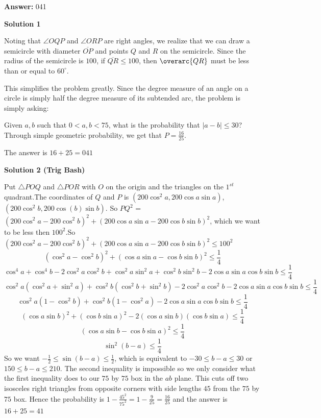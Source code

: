 \begin{enumerate}
 
 \textbf{Answer: }041



\textbf{Solution 1}

Noting that $\angle OQP$ and $\angle ORP$ are right angles, we realize that we can draw a semicircle with diameter $\overline{OP}$ and points $Q$ and $R$ on the semicircle. Since the radius of the semicircle is $100$, if $\overline{QR} \leq 100$, then $\overarc{QR}$ must be less than or equal to $60^{\circ}$.

 This simplifies the problem greatly. Since the degree measure of an angle on a circle is simply half the degree measure of its subtended arc, the problem is simply asking:

 Given $a, b$ such that $0<a, b<75$, what is the probability that $|a-b| \leq 30$? Through simple geometric probability, we get that $P = \frac{16}{25}$.

 The answer is $16+25=\boxed{041}$




\textbf{Solution 2 (Trig Bash)}

Put $\triangle POQ$ and $\triangle POR$ with $O$ on the origin and the triangles on the $1^{st}$ quadrant.The coordinates of $Q$ and $P$ is $(200 \cos^{2}a,200 \cos a\sin a )$, $(200\cos^{2}b,200\cos(b)\sin b)$. So $PQ^{2}$ = $(200 \cos^{2} a - 200 \cos^{2} b)^{2} +(200 \cos a \sin a - 200 \cos b \sin b)^{2}$, which we want to be less then $100^{2}$.So $(200 \cos^{2} a - 200 \cos^{2} b)^{2} +(200 \cos a \sin a - 200 \cos b \sin b)^{2} \le 100^{2}$
 \[(\cos^{2} a - \cos^{2} b)^{2} +(\cos a \sin a - \cos b \sin b)^{2} \le \frac{1}{4}\]
 \[\cos^{4} a + \cos^{4} b - 2\cos^{2} a \cos^{2} b +\cos^{2}a \sin^{2} a + \cos^{2} b \sin^{2} b - 2 \cos a \sin a \cos b \sin b \le \frac{1}{4}\]
 \[\cos^{2} a(\cos^{2} a + \sin^{2} a)+\cos^{2} b(\cos^{2} b+\sin^{2} b) - 2\cos^{2} a \cos^{2} b- 2 \cos a \sin a \cos b \sin b \le \frac{1}{4}\]
 \[\cos^{2} a(1-\cos^{2} b)+\cos^{2} b(1-\cos^{2} a) - 2 \cos a \sin a \cos b \sin b \le \frac{1}{4}\]
 \[(\cos a\sin b)^{2} +(\cos b\sin a)^{2} - 2 (\cos a \sin b)(\cos b \sin a)\le \frac{1}{4}\]
 \[(\cos a\sin b-\cos b\sin a)^{2}\le \frac{1}{4}\]
 \[\sin^{2} (b-a) \le \frac{1}{4}\]So we want $-\frac{1}{2} \le \sin (b-a) \le \frac{1}{2}$, which is equivalent to $-30 \le b-a \le 30$ or $150 \le b-a \le 210$. The second inequality is impossible so we only consider what the first inequality does to our $75$ by $75$ box in the $ab$ plane. This cuts off two isosceles right triangles from opposite corners with side lengths $45$ from the $75$ by $75$ box. Hence the probability is $1-\frac{45^2}{75^2} = 1- \frac{9}{25}=\frac{16}{25}$ and the answer is $16+25 = \boxed{41}$


\end{enumerate}
